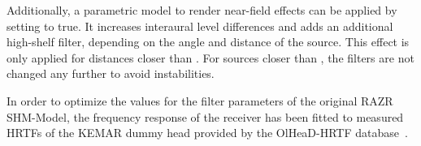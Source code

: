 Additionally, a parametric model to render near-field effects \citep{Spagnol2017}
can be applied by setting  to true. It increases interaural
level differences and adds an additional high-shelf filter, depending on the angle
and distance of the source. This effect is only applied for distances closer than
. For sources closer than , the filters
are not changed any further to avoid instabilities.

In order to optimize the values for the filter parameters of the
original RAZR SHM-Model, the frequency response of the receiver has
been fitted to measured HRTFs of the KEMAR dummy
head \citep{Schwark2020} provided by the OlHeaD-HRTF
database~\citep{Denk2020}.




